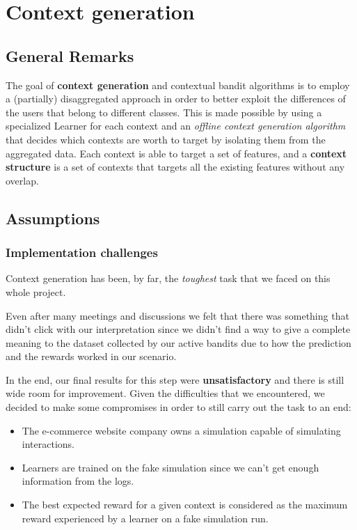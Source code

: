\chapter{Context generation}
\label{chap:ctx_gen}

\section{General Remarks}

The goal of \textbf{context generation} and contextual bandit algorithms is to employ a (partially) disaggregated approach in order to better exploit the differences of the users that belong to different classes.
This is made possible by using a specialized Learner for each context and an \textit{offline context generation algorithm} that decides which contexts are worth to target by isolating them from the aggregated data.
Each context is able to target a set of features, and a \textbf{context structure} is a set of contexts that targets all the existing features without any overlap.

\section{Assumptions}

\subsection{Implementation challenges}

Context generation has been, by far, the \textit{toughest} task that we faced on this whole project.

Even after many meetings and discussions we felt that there was something that didn't click with our interpretation since we didn't find a way to give a complete meaning to the dataset collected by our active bandits due to how the prediction and the rewards worked in our scenario.

In the end, our final results for this step were \textbf{unsatisfactory} and there is still wide room for improvement.
Given the difficulties that we encountered, we decided to make some compromises in order to still carry out the task to an end:

\begin{itemize}
	\item The e-commerce website company owns a simulation capable of simulating interactions.
	\item Learners are trained on the fake simulation since we can't get enough information from the logs.
	\item The best expected reward for a given context is considered as the maximum reward experienced by a learner on a fake simulation run.
\end{itemize}

